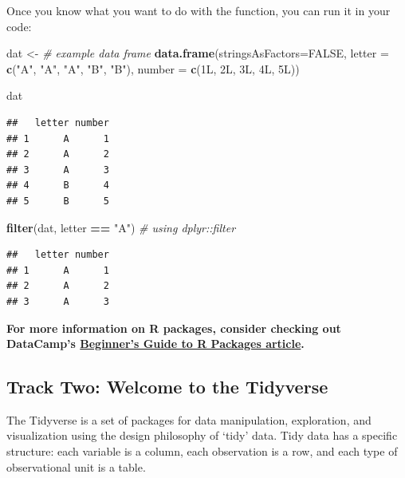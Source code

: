 \documentclass[]{book}
\newenvironment{Shaded}{\begin{snugshade}}{\end{snugshade}}
\newcommand{\KeywordTok}[1]{\textcolor[rgb]{0.13,0.29,0.53}{\textbf{#1}}}
\newcommand{\DataTypeTok}[1]{\textcolor[rgb]{0.13,0.29,0.53}{#1}}
\newcommand{\StringTok}[1]{\textcolor[rgb]{0.31,0.60,0.02}{#1}}
\newcommand{\CommentTok}[1]{\textcolor[rgb]{0.56,0.35,0.01}{\textit{#1}}}
\newcommand{\OtherTok}[1]{\textcolor[rgb]{0.56,0.35,0.01}{#1}}
\newcommand{\OperatorTok}[1]{\textcolor[rgb]{0.81,0.36,0.00}{\textbf{#1}}}
\newcommand{\NormalTok}[1]{#1}
\begin{document}
Once you know what you want to do with the function, you can run it in
your code:

\begin{Shaded}
\begin{Highlighting}[]
\NormalTok{dat <-}\StringTok{ }\CommentTok{# example data frame}
\StringTok{    }\KeywordTok{data.frame}\NormalTok{(}\DataTypeTok{stringsAsFactors=}\OtherTok{FALSE}\NormalTok{,}
               \DataTypeTok{letter =} \KeywordTok{c}\NormalTok{(}\StringTok{"A"}\NormalTok{, }\StringTok{"A"}\NormalTok{, }\StringTok{"A"}\NormalTok{, }\StringTok{"B"}\NormalTok{, }\StringTok{"B"}\NormalTok{),}
               \DataTypeTok{number =} \KeywordTok{c}\NormalTok{(1L, 2L, 3L, 4L, 5L))}

\NormalTok{dat}
\end{Highlighting}
\end{Shaded}

\begin{verbatim}
##   letter number
## 1      A      1
## 2      A      2
## 3      A      3
## 4      B      4
## 5      B      5
\end{verbatim}

\begin{Shaded}
\begin{Highlighting}[]
\KeywordTok{filter}\NormalTok{(dat, letter }\OperatorTok{==}\StringTok{ "A"}\NormalTok{) }\CommentTok{# using dplyr::filter}
\end{Highlighting}
\end{Shaded}

\begin{verbatim}
##   letter number
## 1      A      1
## 2      A      2
## 3      A      3
\end{verbatim}

\textbf{For more information on R packages, consider checking out
DataCamp's
\href{https://www.datacamp.com/community/tutorials/r-packages-guide}{Beginner's
Guide to R Packages article}.}

\subsection{Track Two: Welcome to the
Tidyverse}\label{track-two-welcome-to-the-tidyverse}

The Tidyverse is a set of packages for data manipulation, exploration,
and visualization using the design philosophy of `tidy' data. Tidy data
has a specific structure: each variable is a column, each observation is
a row, and each type of observational unit is a table.
\end{document}
